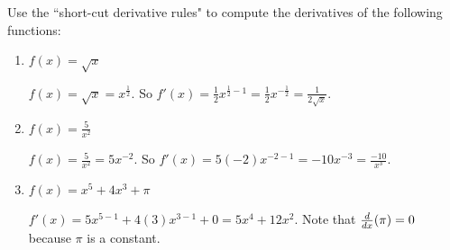 \documentclass[nooutcomes]{ximera}
\begin{document}
\begin{problem}
Use the ``short-cut derivative rules" to compute the derivatives of the following functions:
	
	\begin{enumerate}
	
	\item $f(x) = \sqrt{x}$
	
		\begin{freeResponse}
		$f(x) = \sqrt{x} = x^{\frac{1}{2}}.$  So $f'(x) = \frac{1}{2} x^{\frac{1}{2} - 1} = \frac{1}{2} x^{-\frac{1}{2}} = \frac{1}{2\sqrt{x}}$.
		\end{freeResponse}
			
			
	
	\item $f(x) = \frac{5}{x^2}$
	
		\begin{freeResponse}
		$f(x) = \frac{5}{x^2} = 5x^{-2}.$  So $f'(x) = 5(-2) x^{-2-1} = -10x^{-3} = \frac{-10}{x^3}$.  
		\end{freeResponse}
			
			
	
	\item $f(x) = x^5 + 4x^3 + \pi $
	
		\begin{freeResponse}
		$f'(x) = 5x^{5-1} + 4(3)x^{3-1} + 0 = 5x^4 + 12x^2$.  Note that $\frac{d}{dx} (\pi) = 0$ because $\pi$ is a constant.	
		\end{freeResponse}
			
			
	
	\end{enumerate}
\end{problem}
\end{document}
